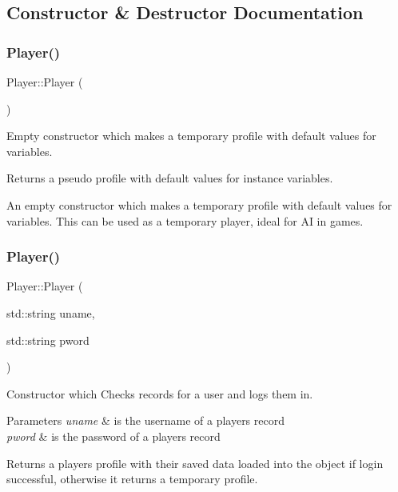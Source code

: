 \subsection{Constructor \& Destructor Documentation}
\mbox{\label{class_player_affe0cc3cb714f6deb4e62f0c0d3f1fd8}} 
\subsubsection{\texorpdfstring{Player()}{Player()}\hspace{0.1cm}{\footnotesize\ttfamily [1/2]}}
{\footnotesize\ttfamily Player\+::\+Player (\begin{DoxyParamCaption}{ }\end{DoxyParamCaption})}



Empty constructor which makes a temporary profile with default values for variables. 

\begin{DoxyReturn}{Returns}
a pseudo profile with default values for instance variables.
\end{DoxyReturn}
An empty constructor which makes a temporary profile with default values for variables. This can be used as a temporary player, ideal for AI in games. \mbox{\label{class_player_a61d2a5c3a5f6a6e4a408ba802337af51}} 
\subsubsection{\texorpdfstring{Player()}{Player()}\hspace{0.1cm}{\footnotesize\ttfamily [2/2]}}
{\footnotesize\ttfamily Player\+::\+Player (\begin{DoxyParamCaption}\item[{std\+::string}]{uname,  }\item[{std\+::string}]{pword }\end{DoxyParamCaption})}



Constructor which Checks records for a user and logs them in. 


\begin{DoxyParams}{Parameters}
{\em uname} & is the username of a player\textquotesingle{}s record \\
\hline
{\em pword} & is the password of a player\textquotesingle{}s record \\
\hline
\end{DoxyParams}
\begin{DoxyReturn}{Returns}
a player\textquotesingle{}s profile with their saved data loaded into the object if login successful, otherwise it returns a temporary profile. 
\end{DoxyReturn}


